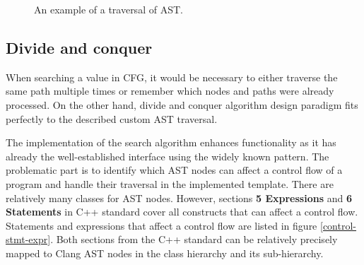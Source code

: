 \begin{figure}[h!]
\vspace{.5cm}
\centering
{}
\caption{An example of a traversal of AST.}
\label{prefetch-example-ast}
\end{figure}

\subsection{Divide and conquer}
When searching a value in CFG, it would be necessary to either traverse the same path multiple times or remember which nodes and paths were already processed. On the other hand, divide and conquer algorithm design paradigm fits perfectly to the described custom AST traversal.

The implementation of the search algorithm enhances  functionality as it has already the well-established interface using the widely known pattern. The problematic part is to identify which AST nodes can affect a control flow of a program and handle their traversal in the implemented template. There are relatively many classes for AST nodes. However, sections \textbf{5 Expressions} and \textbf{6 Statements} in C++ standard \cite{standard} cover all constructs that can affect a control flow. Statements and expressions that affect a control flow are listed in figure \ref{control-stmt-expr}. Both sections from the C++ standard can be relatively precisely mapped to Clang AST nodes in the  class hierarchy and its  sub-hierarchy.

